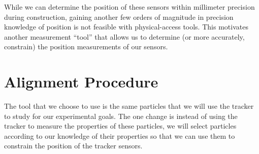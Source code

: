 
While we can determine the position of these sensors within millimeter precision
during construction, gaining another few orders of magnitude in precision knowledge
of position is not feasible with physical-access tools.
This motivates another measurement ``tool'' that allows us to determine
(or more accurately, constrain) the position measurements of our sensors.

\section{Alignment Procedure}
The tool that we choose to use is the same particles that we will use the tracker
to study for our experimental goals.
The one change is instead of using the tracker to measure the properties of these particles,
we will select particles according to our knowledge of their properties so that we can use
them to constrain the position of the tracker sensors.
